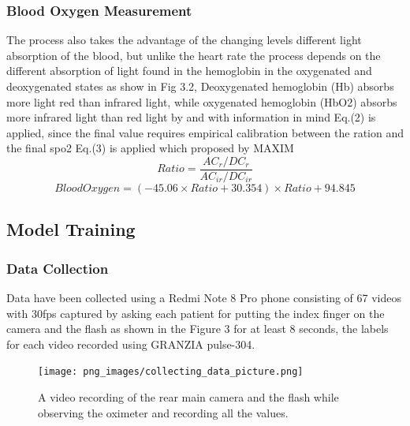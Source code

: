 \documentclass{bmcart}
\begin{document}
\subsubsection*{Blood Oxygen Measurement}
The process also takes the advantage of  the changing levels different light
absorption of the blood, but unlike the heart rate the process depends on the
different absorption of light found in the hemoglobin in the oxygenated and
deoxygenated states as show in Fig 3.2, Deoxygenated hemoglobin (Hb) absorbs
more light red than infrared light, while oxygenated hemoglobin (HbO2) absorbs
more infrared light than red light by and with information in mind Eq.(2) is
applied, since the final value requires empirical calibration between the ration
and the final spo2 Eq.(3) is applied which proposed by MAXIM%
%
\[
 Ratio = \frac{AC_r/DC_r}{AC_{ir}/DC_{ir}}
 \tag{2}
\]
\[
 Blood Oxygen = (-45.06 \times Ratio + 30.354) \times Ratio + 94.845
 \tag{3}
\]
%

\subsection*{Model Training}
\subsubsection*{Data Collection}
Data have been collected using a Redmi Note 8 Pro phone consisting of 67 videos
with 30fps captured by asking each patient for putting the index finger on the
camera and the flash as shown in the Figure 3 for at least 8 seconds, the
labels for each video recorded using GRANZIA pulse-304.
\begin{figure}[h!]
  \texttt{[image: png\_images/collecting\_data\_picture.png]}
  \caption{
      A video recording of the rear main camera and the flash while observing
      the oximeter and recording all the values.}
\end{figure}
\FloatBarrier
\end{document}
